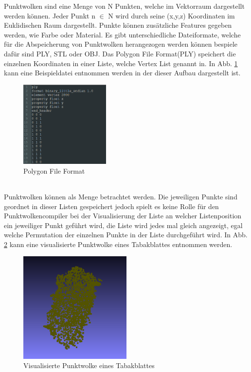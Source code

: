 \documentclass{llncs}
\begin{document}
Punktwolken sind eine Menge von N Punkten, welche im Vektorraum dargestellt werden können. Jeder Punkt n $\in$ N wird durch seine (x,y,z) Koordinaten im Euklidischen Raum dargestellt. Punkte können zusätzliche Features gegeben werden, wie Farbe oder Material. Es gibt unterschiedliche Dateiformate, welche für die Abspeicherung von Punktwolken herangezogen werden können bespiele dafür sind PLY, STL oder OBJ. Das Polygon File Format(PLY) speichert die einzelnen Koordinaten in einer Liste, welche Vertex List genannt in. In Abb. \ref{fig:Bild7} kann eine Beispieldatei entnommen werden in der dieser Aufbau dargestellt ist. 
\\
\begin{figure}[htbp] 
	\centering
	\includegraphics[width=0.4\textwidth]{plyexample.png}
	\caption{Polygon File Format}
	\label{fig:Bild7}
\end{figure}
\\
Punktwolken können als Menge betrachtet werden. Die jeweiligen Punkte sind geordnet in dieser Listen gespeichert jedoch spielt es keine Rolle für den Punktwolkencompiler bei der Visualisierung der Liste an welcher Listenposition ein jeweiliger Punkt geführt wird, die Liste wird jedes mal gleich angezeigt, egal welche Permutation der einzelnen Punkte in der Liste durchgeführt wird. In Abb. \ref{fig:Bild8} kann eine visualisierte Punktwolke eines Tabakblattes entnommen werden. 
\\
\begin{figure}[htbp] 
	\centering
	\includegraphics[width=0.5\textwidth]{leaf1.png}
	\caption{Visualisierte Punktwolke eines Tabakblattes}
	\label{fig:Bild8}
\end{figure}
\newpage
\end{document}
